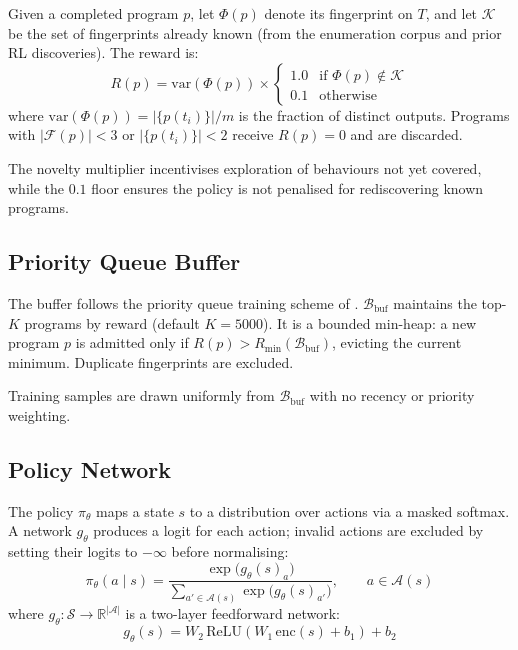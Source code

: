 \documentclass[11pt,a4paper]{article}
\begin{document}
Given a completed program $p$, let $\Phi(p)$ denote its fingerprint on $T$, and let
$\mathcal{K}$ be the set of fingerprints already known (from the enumeration corpus and
prior RL discoveries). The reward is:
\[
  R(p) = \mathrm{var}(\Phi(p)) \times
    \begin{cases}
      1.0 & \text{if } \Phi(p) \notin \mathcal{K} \\
      0.1 & \text{otherwise}
    \end{cases}
\]
where $\mathrm{var}(\Phi(p)) = |\{p(t_i)\}| / m$ is the fraction of distinct outputs.
Programs with $|\mathcal{F}(p)| < 3$ or $|\{p(t_i)\}| < 2$ receive $R(p) = 0$ and are
discarded.

The novelty multiplier incentivises exploration of behaviours not yet covered, while the
$0.1$ floor ensures the policy is not penalised for rediscovering known programs.

\subsection{Priority Queue Buffer}\label{sec:pq}

The buffer follows the priority queue training scheme of \citet{abolafia2018priority}.
$\mathcal{B}_{\mathrm{buf}}$ maintains the top-$K$ programs by reward (default
$K = 5000$). It is a bounded min-heap: a new program $p$ is admitted only if
$R(p) > R_{\min}(\mathcal{B}_{\mathrm{buf}})$, evicting the current minimum. Duplicate
fingerprints are excluded.

Training samples are drawn uniformly from $\mathcal{B}_{\mathrm{buf}}$ with no recency or
priority weighting.

\subsection{Policy Network}\label{sec:policy}

The policy $\pi_\theta$ maps a state $s$ to a distribution over actions via a masked
softmax. A network $g_\theta$ produces a logit for each action; invalid actions are
excluded by setting their logits to $-\infty$ before normalising:
\[
  \pi_\theta(a \mid s)
    = \frac{\exp\bigl(g_\theta(s)_a\bigr)}
           {\displaystyle\sum_{a' \in \mathcal{A}(s)} \exp\bigl(g_\theta(s)_{a'}\bigr)},
  \qquad a \in \mathcal{A}(s)
\]
where $g_\theta : \mathcal{S} \to \mathbb{R}^{|\mathcal{A}|}$ is a two-layer feedforward
network:
\[
  g_\theta(s) = W_2\, \mathrm{ReLU}(W_1\, \mathrm{enc}(s) + b_1) + b_2
\]
\end{document}
